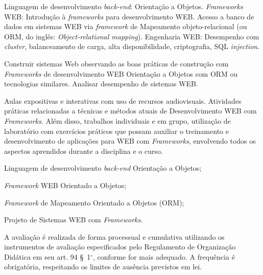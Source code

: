 \begin{pud}
	
	
	\ementa
	Linguagem de desenvolvimento \textit{back-end}: Orientação a Objetos. \textit{Frameworks} WEB: Introdução à \textit{frameworks} para desenvolvimento WEB. Acesso a banco de dados em sistemas WEB via \textit{framework} de Mapeamento objeto-relacional (ou ORM, do inglês: \textit{Object-relational mapping}). Engenharia WEB: Desempenho com \textit{cluster}, balanceamento de carga, alta disponibilidade, criptografia, SQL \textit{injection}.
	
	\objetivos
	Construir sistemas Web observando as boas práticas de construção com \textit{Frameworks} de desenvolvimento WEB Orientação a Objetos com ORM ou tecnologias similares.  Analisar desempenho de sistemas WEB.
	
	\metodologia
	Aulas expositivas e interativas com uso de recursos audiovisuais. Atividades práticas relacionadas a técnicas e métodos atuais de Desenvolvimento WEB com \textit{Frameworks}. Além disso, trabalhos individuais e em grupo, utilização de laboratório com exercícios práticos que possam auxiliar o treinamento e desenvolvimento de aplicações para WEB com \textit{Frameworks}, envolvendo todos os aspectos aprendidos durante a disciplina e o curso.    
	
	
	\programa
	\begin{description}[itemsep=0em]
		\item[UNIDADE I:] Linguagem de desenvolvimento \textit{back-end} Orientação a Objetos;
	    \item[UNIDADE II:]  \textit{Framework} WEB Orientado a Objetos;
        \item[UNIDADE III:] \textit{Framework} de Mapeamento Orientado a Objetos (ORM);
        \item[UNIDADE IV:] Projeto de Sistemas WEB com \textit{Frameworks}.
	\end{description}
	
	
	\avaliacao
	A avaliação é realizada de forma processual e cumulativa utilizando os instrumentos de avaliação especificados pelo Regulamento de Organização Didática em seu art. 94 \S~1$^\circ$, conforme for mais adequado. A frequência é obrigatória, respeitando os limites de ausência previstos em lei.
	\naopresencial
	
	
	\begin{bibbasica}
			

\end{bibbasica}
\end{pud}
